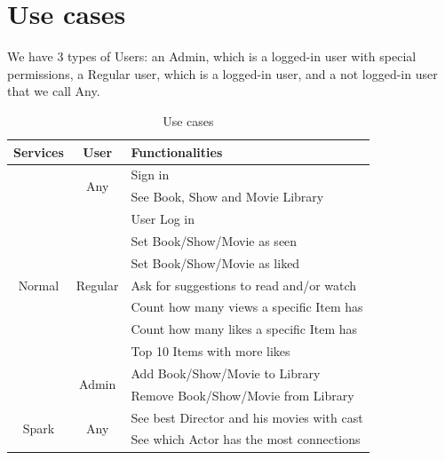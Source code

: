 \documentclass[oneside]{article}
\newcommand*\fpar{\hspace{1ex}}
\begin{document}
\section{Use cases}
\label{sec:cases}
\fpar We have 3 types of Users: an Admin, which is a logged-in user with special permissions, a Regular user, which is a logged-in user, and a not logged-in user that we call Any.
\begin{table}[H]
  \centering
  \begin{tabular}{c|c|l} 
    Services & User & Functionalities \\ \hline
    \multirow{11}{*}{ Normal }
      & \multirow{2}{*}{ Any } 
        & Sign in \\
      & & See Book, Show and Movie Library \\ \cline{2-3}
      & \multirow{7}{*}{ Regular } 
        & User Log in \\
      & & Set Book/Show/Movie as seen \\
      & & Set Book/Show/Movie as liked \\ 
      & & Ask for suggestions to read and/or watch \\ 
      & & Count how many views a specific Item has \\
      & & Count how many likes a specific Item has \\
      & & Top 10 Items with more likes \\ \cline{2-3}
    & \multirow{2}{*}{ Admin } 
        & Add Book/Show/Movie to Library \\
      & & Remove Book/Show/Movie from Library \\ \hline
    \multirow{2}{*}{ Spark }
      & \multirow{2}{*}{ Any }
        & See best Director and his movies with cast \\
      & & See which Actor has the most connections \\
  \end{tabular}
  \caption{Use cases}
\end{table}
\end{document}

